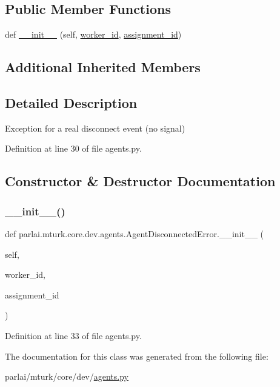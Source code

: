 \subsection*{Public Member Functions}
\begin{DoxyCompactItemize}
\item 
def \hyperlink{classparlai_1_1mturk_1_1core_1_1dev_1_1agents_1_1AgentDisconnectedError_a4a25d21dfcd5e987b5843226cfe586c1}{\+\_\+\+\_\+init\+\_\+\+\_\+} (self, \hyperlink{classparlai_1_1mturk_1_1core_1_1dev_1_1agents_1_1AbsentAgentError_a26db50c87a5d4954907d538de3da875c}{worker\+\_\+id}, \hyperlink{classparlai_1_1mturk_1_1core_1_1dev_1_1agents_1_1AbsentAgentError_ab9cf020196d28024b307c41a3fff6be1}{assignment\+\_\+id})
\end{DoxyCompactItemize}
\subsection*{Additional Inherited Members}


\subsection{Detailed Description}
\begin{DoxyVerb}Exception for a real disconnect event (no signal)\end{DoxyVerb}
 

Definition at line 30 of file agents.\+py.



\subsection{Constructor \& Destructor Documentation}
\mbox{\label{classparlai_1_1mturk_1_1core_1_1dev_1_1agents_1_1AgentDisconnectedError_a4a25d21dfcd5e987b5843226cfe586c1}} 
\subsubsection{\texorpdfstring{\+\_\+\+\_\+init\+\_\+\+\_\+()}{\_\_init\_\_()}}
{\footnotesize\ttfamily def parlai.\+mturk.\+core.\+dev.\+agents.\+Agent\+Disconnected\+Error.\+\_\+\+\_\+init\+\_\+\+\_\+ (\begin{DoxyParamCaption}\item[{}]{self,  }\item[{}]{worker\+\_\+id,  }\item[{}]{assignment\+\_\+id }\end{DoxyParamCaption})}



Definition at line 33 of file agents.\+py.



The documentation for this class was generated from the following file\+:\begin{DoxyCompactItemize}
\item 
parlai/mturk/core/dev/\hyperlink{parlai_2mturk_2core_2dev_2agents_8py}{agents.\+py}\end{DoxyCompactItemize}
